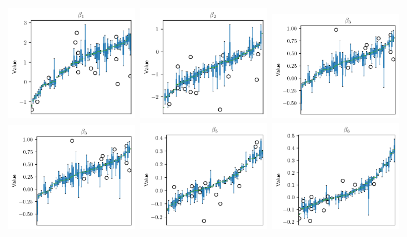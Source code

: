 \begin{figure}[h]
	\centering
	\includegraphics[width=0.3\textwidth]{files/beta_var/beta_1_var.png}
	\includegraphics[width=0.3\textwidth]{files/beta_var/beta_2_var.png}
	\includegraphics[width=0.3\textwidth]{files/beta_var/beta_3_var.png}
	\includegraphics[width=0.3\textwidth]{files/beta_var/beta_3_var.png}
	\includegraphics[width=0.3\textwidth]{files/beta_var/beta_5_var.png}
	\includegraphics[width=0.3\textwidth]{files/beta_var/beta_6_var.png}

\end{figure}
